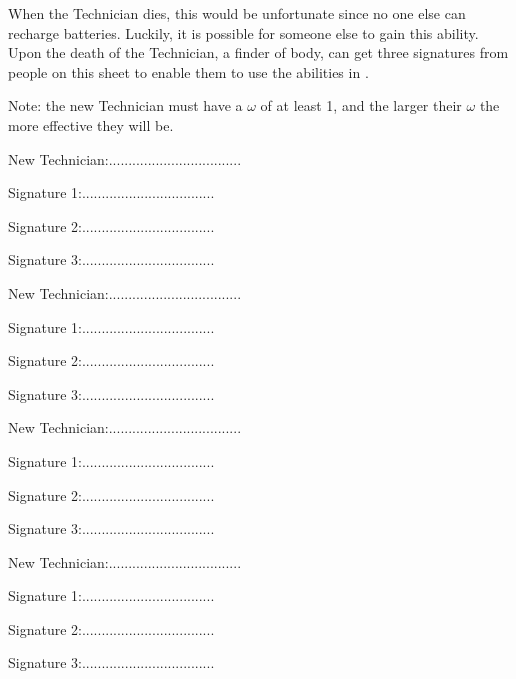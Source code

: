 \documentclass[green]{guildcamp3}
\begin{document}
\name{\gNewTech{}}

When the Technician dies, this would be unfortunate since no one else can recharge batteries. Luckily, it is possible for someone else to gain this ability. Upon the death of the Technician, a finder of  body, can get three signatures from \bTechWorld{} people on this sheet to enable them to use the abilities in \gBatterycharge{}.

Note: the new Technician must have a $\omega$ of at least 1, and the larger their $\omega$ the more effective they will be.

New Technician:..................................

Signature 1:..................................

Signature 2:..................................

Signature 3:..................................


New Technician:..................................

Signature 1:..................................

Signature 2:..................................

Signature 3:..................................


New Technician:..................................

Signature 1:..................................

Signature 2:..................................

Signature 3:..................................


New Technician:..................................

Signature 1:..................................

Signature 2:..................................

Signature 3:..................................
\end{document}

